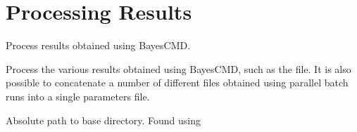 \documentclass[letterpaper,10pt,english]{sphinxmanual}
\begin{document}
\section{Processing Results}
\label{\detokenize{misc:processing-results}}\label{\detokenize{misc:module-bayescmd.results_handling}}
Process results obtained using BayesCMD.

Process the various results obtained using BayesCMD, such as the
 file. It is also possible to concatenate a number of different
 files obtained using parallel batch runs into a single
parameters file.

\begin{fulllineitems}
\label{\detokenize{misc:bayescmd.results_handling.BAYESCMD}}
 \textendash{} Absolute path to base directory. Found using
{\hyperref[\detokenize{misc:bayescmd.util.findBaseDir}]{}}

\end{fulllineitems}

\end{document}
